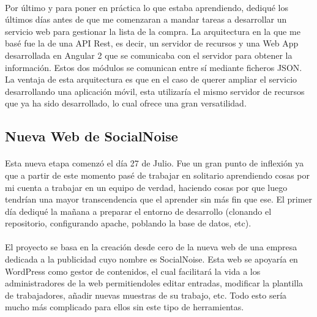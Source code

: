 \documentclass[10pt, a4paper,spanish]{article}
\begin{document}
            \paragraph{}
            Por último y para poner en práctica lo que estaba aprendiendo, dediqué los últimos días antes de que me comenzaran a mandar tareas a desarrollar un servicio web para gestionar la lista de la compra. La arquitectura en la que me basé fue la de una API Rest, es decir, un servidor de recursos y una Web App desarrollada en Angular 2 que se comunicaba con el servidor para obtener la información. Estos dos módulos se comunican entre sí mediante ficheros JSON. La ventaja de esta arquitectura es que en el caso de querer ampliar el servicio desarrollando una aplicación móvil, esta utilizaría el mismo servidor de recursos que ya ha sido desarrollado, lo cual ofrece una gran versatilidad.


        \subsection{Nueva Web de SocialNoise}

            \paragraph{}
            Esta nueva etapa comenzó el día 27 de Julio. Fue un gran punto de inflexión ya que a partir de este momento pasé de trabajar en solitario aprendiendo cosas por mi cuenta a trabajar en un equipo de verdad, haciendo cosas por que luego tendrían una mayor transcendencia que el aprender sin más fin que ese. El primer día dediqué la mañana a preparar el entorno de desarrollo (clonando el repositorio, configurando apache, poblando la base de datos, etc).

            \paragraph{}
            El proyecto se basa en la creación desde cero de la nueva web de una empresa dedicada a la publicidad cuyo nombre es SocialNoise. Esta web se apoyaría en WordPress como gestor de contenidos, el cual facilitará la vida a los administradores de la web permitiendoles editar entradas, modificar la plantilla de trabajadores, añadir nuevas muestras de su trabajo, etc. Todo esto sería mucho más complicado para ellos sin este tipo de herramientas.
\end{document}
